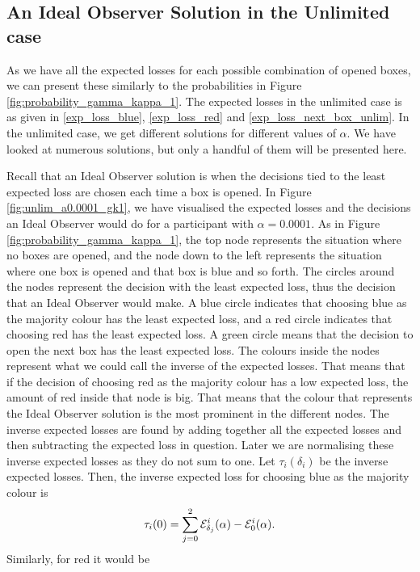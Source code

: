 \subsection{An Ideal Observer Solution in the Unlimited case}

As we have all the expected losses for each possible combination of opened boxes, we can present these similarly to the probabilities in Figure \ref{fig:probability_gamma_kappa_1}. 
The expected losses in the unlimited case is as given in \eqref{exp_loss_blue}, \eqref{exp_loss_red} and \eqref{exp_loss_next_box_unlim}. In the unlimited case, we get different solutions for different values of $\alpha$. We have looked at numerous solutions, but only a handful of them will be presented here. 

Recall that an Ideal Observer solution is when the decisions tied to the least expected loss are chosen each time a box is opened. In Figure \ref{fig:unlim_a0.0001_gk1}, we have visualised the expected losses and the decisions an Ideal Observer would do for a participant with $\alpha=0.0001$. As in Figure \ref{fig:probability_gamma_kappa_1}, the top node represents the situation where no boxes are opened, and the node down to the left represents the situation where one box is opened and that box is blue and so forth. The circles around the nodes represent the decision with the least expected loss, thus the decision that an Ideal Observer would make. A blue circle indicates that choosing blue as the majority colour has the least expected loss, and a red circle indicates that choosing red has the least expected loss. A green circle means that the decision to open the next box has the least expected loss. The colours inside the nodes represent what we could call the inverse of the expected losses. That means that if the decision of choosing red as the majority colour has a low expected loss, the amount of red inside that node is big. That means that the colour that represents the Ideal Observer solution is the most prominent in the different nodes. The inverse expected losses are found by adding together all the expected losses and then subtracting the expected loss in question. Later we are normalising these inverse expected losses as they do not sum to one. Let $\tau_i(\delta_i)$ be the inverse expected losses. Then, the inverse expected loss for choosing blue as the majority colour is 
\begin{equation*}
    \tau_i(0) = \sum_{j=0}^2 \mathcal{E}_{\delta_j}^i(\alpha) - \mathcal{E}_0^i(\alpha).
\end{equation*}
Similarly, for red it would be
